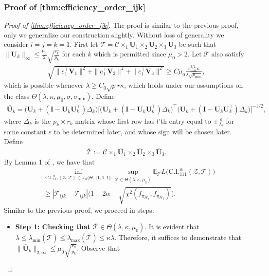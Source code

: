 \documentclass[10pt]{article}
\newcommand{\0}{{\mathbf{0}}}
\newcommand{\1}{{\mathbf{1}}}
\newcommand{\I}{{\mathbf{I}}}
\newcommand{\U}{{\mathbf{U}}}
\renewcommand{\citet}{\cite}
\renewcommand{\t}{^{\top}}
\newcommand{\eps}{\varepsilon}
\begin{document}
\subsubsection{Proof of \cref{thm:efficiency_order_ijk}}
\begin{proof}[Proof of \cref{thm:efficiency_order_ijk}]
The proof is similar to the previous proof, only we generalize our construction slightly.  Without loss of generality we consider $i = j = k = 1$.  First let $\mathcal{T} = \mathcal{C} \times_1 \U_1 \times_2 \U_2 \times_3 \U_3$ be such that $\| \U_k \|_{\infty} \leq \frac{\mu_0}{2} \sqrt{\frac{r_k}{p_k}}$ for each $k$ which is permitted since $\mu_0 > 2$.  Let $\mathcal{T}$ also satisfy 
\begin{align*}
    \sqrt{\| e_1\t \mathbf{V}_1 \|^2 + \|e_1\t \mathbf{V}_2 \|^2 + \| e_1\t \mathbf{V}_3 \|^2} \geq C \mu_0 \frac{r_{\max}^{3/2}\kappa}{\lambda \sqrt{p_{\min}}},
\end{align*}
which is possible whenever $\lambda \geq C_0 \sqrt{p} r \kappa$, which holds under our assumptions on the class $\Theta(\lambda,\kappa,\mu_0,\sigma,\sigma_{\min})$. Define
\begin{align*}
    \mathbf{\bar U}_k = \bigg( \U_k + (\I - \U_k \U_k\t) \Delta_k \bigg) \Bigg[\bigg( \U_k + (\I - \U_k \U_k\t) \Delta_k \bigg)\t \bigg( \U_k + (\I - \U_k \U_k\t) \Delta_k \bigg)  \Bigg]^{-1/2},
\end{align*}
where $\Delta_k$ is the $p_k \times r_k$ matrix whose first row has $l$'th entry equal to $\pm\frac{\eps}{\lambda_l}$ for some constant $\eps$ to be determined later, and whose sign will be chosen later. Define
\begin{align*}
    \mathcal{\bar T} := \mathcal{C} \times_1 \mathbf{\bar U}_1 \times_2 \mathbf{\bar U}_2 \times_3 \mathbf{\bar U}_3.
\end{align*}
 By Lemma 1 of \citet{cai_confidence_2017}, we have that
\begin{align*}
 & \inf_{\mathrm{C.I.}^{\alpha}_{111}(\mathcal{Z},\mathcal{T}) \in \mathcal{I}_{\alpha}(\Theta,\{1,1,1\}} \sup_{\mathcal{T} \in \Theta(\lambda,\kappa,\mu_0)} \mathbb{E}_{\mathcal{T}} L\big( \mathrm{C.I.}_{111}^{\alpha}(\mathcal{Z},\mathcal{T}) \big) \\&\geq | \mathcal{T}_{ijk} - \mathcal{\bar T}_{ijk}| \big( 1 - 2 \alpha - \sqrt{\chi^2(f_{\pi_{\mathcal{H}_1}},f_{\pi_{{\mathcal{H}_0}}}) } \big).
\end{align*}
Similar to the previous proof, we proceed in steps.
\begin{itemize}
    \item \textbf{Step 1: Checking that $\mathcal{\bar T} \in \Theta(\lambda,\kappa,\mu_0)$}. It is evident that $\lambda \leq \lambda_{\min}(\mathcal{\bar T}) \leq \lambda_{\max}(\mathcal{\bar T}) \leq \kappa \lambda$.  Therefore, it suffices to demonstrate that $\|\mathbf{\bar U}_k \|_{2,\infty} \leq \mu_0 \sqrt{\frac{r_k}{p_k}}$.  Observe that

\end{itemize}
\end{proof}
\end{document}
